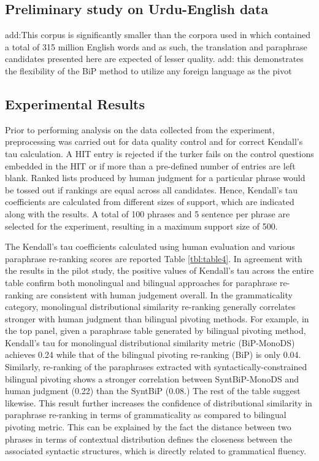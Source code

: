 \documentclass[11pt]{article}
\begin{document}
\subsection{Preliminary study on Urdu-English data}
\label{sect:results_ur_en}

add:This corpus is significantly smaller than the corpora used in  which contained a total of 315 million English words and as such, the translation and paraphrase candidates presented here are expected of lesser quality.
add: this demonstrates the flexibility of the BiP method to utilize any foreign language as the pivot

\subsection{Experimental Results}
\label{sect:results_fr_en}

Prior to performing analysis on the data collected from the experiment, preprocessing was carried out for data quality control and for correct Kendall's tau calculation. A HIT entry is rejected if the turker fails on the control questions embedded in the HIT or if more than a pre-defined number of entries are left blank. Ranked lists produced by human judgment for a particular phrase would be tossed out if rankings are equal across all candidates. Hence, Kendall's tau coefficients are calculated from different sizes of support, which are indicated along with the results. A total of 100 phrases and 5 sentence per phrase are selected for the experiment, resulting in a maximum support size of 500.

The Kendall's tau coefficients calculated using human evaluation and various paraphrase re-ranking scores are reported Table \ref{tbl:table4}. In agreement with the results in the pilot study, the positive values of Kendall's tau across the entire table confirm both monolingual and bilingual approaches for paraphrase re-ranking are consistent with human judgement overall. In the grammaticality category, monolingual distributional similarity re-ranking generally correlates stronger with human judgment than bilingual pivoting methods. For example, in the top panel, given a paraphrase table generated by bilingual pivoting method, Kendall's tau for monolingual distributional similarity metric (BiP-MonoDS) achieves 0.24 while that of the bilingual pivoting re-ranking (BiP) is only 0.04. Similarly, re-ranking of the paraphrases extracted with syntactically-constrained bilingual pivoting shows a stronger correlation between SyntBiP-MonoDS and human judgment (0.22) than the SyntBiP (0.08.) The rest of the table suggest likewise. This result further increases the confidence of distributional similarity in paraphrase re-ranking in terms of grammaticality as compared to bilingual pivoting metric. This can be explained by the fact the distance between two phrases in terms of contextual distribution defines the closeness between the associated syntactic structures, which is directly related to grammatical fluency.
\end{document}
